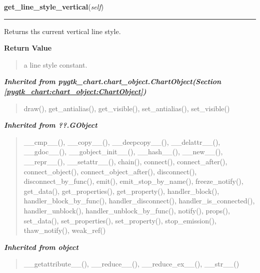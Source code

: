 \hspace{.8\funcindent}\begin{boxedminipage}{\funcwidth}

    \raggedright \textbf{get\_line\_style\_vertical}(\textit{self})

    \vspace{-1.5ex}

    \rule{\textwidth}{0.5\fboxrule}
\setlength{\parskip}{2ex}
    Returns ths current vertical line style.

\setlength{\parskip}{1ex}
      \textbf{Return Value}
    \vspace{-1ex}

      \begin{quote}
      a line style constant.

      \end{quote}

    \end{boxedminipage}


\large{\textbf{\textit{Inherited from pygtk\_chart.chart\_object.ChartObject\textit{(Section \ref{pygtk_chart:chart_object:ChartObject})}}}}

\begin{quote}
draw(), get\_antialias(), get\_visible(), set\_antialias(), set\_visible()
\end{quote}

\large{\textbf{\textit{Inherited from ??.GObject}}}

\begin{quote}
\_\_cmp\_\_(), \_\_copy\_\_(), \_\_deepcopy\_\_(), \_\_delattr\_\_(), \_\_gdoc\_\_(), \_\_gobject\_init\_\_(), \_\_hash\_\_(), \_\_new\_\_(), \_\_repr\_\_(), \_\_setattr\_\_(), chain(), connect(), connect\_after(), connect\_object(), connect\_object\_after(), disconnect(), disconnect\_by\_func(), emit(), emit\_stop\_by\_name(), freeze\_notify(), get\_data(), get\_properties(), get\_property(), handler\_block(), handler\_block\_by\_func(), handler\_disconnect(), handler\_is\_connected(), handler\_unblock(), handler\_unblock\_by\_func(), notify(), props(), set\_data(), set\_properties(), set\_property(), stop\_emission(), thaw\_notify(), weak\_ref()
\end{quote}

\large{\textbf{\textit{Inherited from object}}}

\begin{quote}
\_\_getattribute\_\_(), \_\_reduce\_\_(), \_\_reduce\_ex\_\_(), \_\_str\_\_()
\end{quote}

